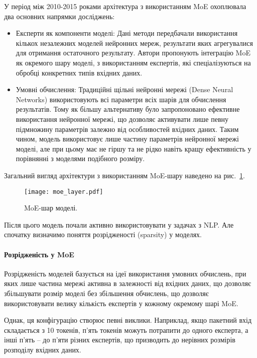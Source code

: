 У період між 2010-2015 роками архітектура з використанням MoE охоплювала два основних напрямки досліджень:
\begin{itemize}
    \item {Експерти як компоненти моделі}: Дані методи передбачали використання кількох незалежних моделей нейронних мереж, результати яких агрегувалися для отримання остаточного результату. Автори \cite{eigen2014learningfactoredrepresentationsdeep} пропонують інтеграцію MoE як окремого шару моделі, з використанням експертів, які спеціалізуються на обробці конкретних типів вхідних даних.
    \item {Умовні обчислення}: Традиційні щільні нейронні мережі (Dense Neural Networks) використовують всі параметри всіх шарів для обчислення результатів. Тому як більшу альтернативу \cite{bengio2016conditionalcomputationneuralnetworks} було запропоновано ефективне використання нейронної мережі, що дозволяє активувати лише певну підмножину параметрів залежно від особливостей вхідних даних. Таким чином, модель використовує лише частину параметрів нейронної мережі моделі, але при цьому має не гіршу та не рідко навіть кращу ефективність у порівнянні з моделями подібного розміру.
\end{itemize}

Загальний вигляд архітектури з використанням MoE-шару наведено на рис.~\ref{fig:moe-layer}.

\begin{figure}[!h]
    \centering
    \texttt{[image: moe\_layer.pdf]}
    \caption{MoE-шар моделі.}
    \label{fig:moe-layer}
\end{figure}

Після цього модель почали активно використовувати у задачах з NLP. Але спочатку визначимо поняття розрідженості (sparsity) у моделях.

\paragraph{Розрідженість у MoE}
Розрідженість моделей базується на ідеї використання умовних обчислень, при яких лише частина мережі активна в залежності від вхідних даних, що дозволяє збільшувати розмір моделі без збільшення обчислень, що дозволяє використовувати велику кількість експертів у кожному окремому шарі MoE.

Однак, ця конфігурацію створює певні виклики. Наприклад, якщо пакетний вхід складається з 10 токенів, п'ять токенів можуть потрапити до одного експерта, а інші п'ять -- до п'яти різних експертів, що призводить до нерівних розмірів розподілу вхідних даних.

